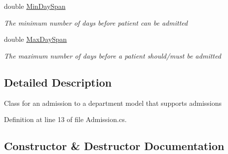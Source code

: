 \begin{DoxyCompactItemize}
double \hyperlink{class_general_health_care_elements_1_1_treatment_admission_types_1_1_admission_a736d7e095899a6615b5c042d08d5d3d5}{Min\+Day\+Span}
\begin{DoxyCompactList}\small\item\em The minimum number of days before patient can be admitted \end{DoxyCompactList}\item 
double \hyperlink{class_general_health_care_elements_1_1_treatment_admission_types_1_1_admission_a53649a5307120f80b1b543ae09e602a5}{Max\+Day\+Span}
\begin{DoxyCompactList}\small\item\em The maximum number of days before a patient should/must be admitted \end{DoxyCompactList}\end{DoxyCompactItemize}


\subsection{Detailed Description}
Class for an admission to a department model that supports admissions 



Definition at line 13 of file Admission.\+cs.



\subsection{Constructor \& Destructor Documentation}
